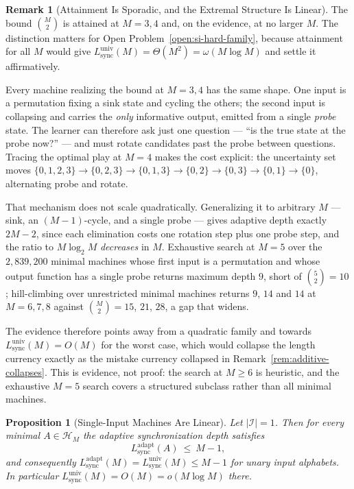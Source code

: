 \documentclass[12pt]{article}
\newtheorem{proposition}[theorem]{Proposition}
\theoremstyle{definition}
\newtheorem{remark}[theorem]{Remark}
\newcommand{\Lsync}{L_{\mathrm{sync}}^{\mathrm{adapt}}}
\newcommand{\Lsyncu}{L_{\mathrm{sync}}^{\mathrm{univ}}}
\begin{document}
\begin{remark}[Attainment Is Sporadic, and the Extremal Structure Is Linear]
\label{rem:attainment-sporadic}
The bound $\binom{M}{2}$ is attained at $M=3,4$ and, on the evidence, at no
larger $M$.  The distinction matters for
Open Problem~\ref{open:si-hard-family}, because attainment for all $M$ would
give $\Lsyncu(M)=\Theta(M^2)=\omega(M\log M)$ and settle it affirmatively.

Every machine realizing the bound at $M=3,4$ has the same shape.  One input is
a permutation fixing a sink state and cycling the others; the second input is
collapsing and carries the \emph{only} informative output, emitted from a
single \emph{probe} state.  The learner can therefore ask just one question ---
``is the true state at the probe now?'' --- and must rotate candidates past the
probe between questions.  Tracing the optimal play at $M=4$ makes the cost
explicit: the uncertainty set moves
$\{0,1,2,3\}\to\{0,2,3\}\to\{0,1,3\}\to\{0,2\}\to\{0,3\}\to\{0,1\}\to\{0\}$,
alternating probe and rotate.

That mechanism does not scale quadratically.  Generalizing it to arbitrary $M$
--- sink, an $(M-1)$-cycle, and a single probe --- gives adaptive depth exactly
$2M-2$, since each elimination costs one rotation step plus one probe step, and
the ratio to $M\log_2M$ \emph{decreases} in $M$.  Exhaustive search at $M=5$
over the $2{,}839{,}200$ minimal machines whose first input is a permutation
and whose output function has a single probe returns maximum depth $9$, short
of $\binom{5}{2}=10$; hill-climbing over unrestricted minimal machines returns
$9$, $14$ and $14$ at $M=6,7,8$ against $\binom{M}{2}=15$, $21$, $28$, a gap
that widens.

The evidence therefore points away from a quadratic family and towards
$\Lsyncu(M)=O(M)$ for the worst case, which would collapse the length currency
exactly as the mistake currency collapsed in
Remark~\ref{rem:additive-collapses}.  This is evidence, not proof: the search
at $M\ge6$ is heuristic, and the exhaustive $M=5$ search covers a structured
subclass rather than all minimal machines.
\end{remark}

\begin{proposition}[Single-Input Machines Are Linear]
\label{prop:lsyncu-single-input}
Let $|\mathcal I|=1$.  Then for every minimal $A\in\mathcal H_M$ the adaptive
synchronization depth satisfies
\[
L_{\mathrm{sync}}^{\mathrm{adapt}}(A)\ \le\ M-1 ,
\]
and consequently $\Lsync(M)=\Lsyncu(M)\le M-1$ for unary input alphabets.  In
particular $\Lsyncu(M)=O(M)=o(M\log M)$ there.
\end{proposition}
\end{document}
